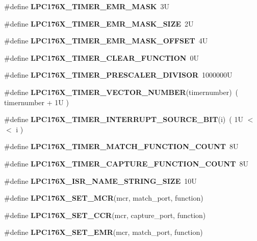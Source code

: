 \begin{DoxyCompactItemize}
\#define {\bfseries L\+P\+C176\+X\+\_\+\+T\+I\+M\+E\+R\+\_\+\+E\+M\+R\+\_\+\+M\+A\+SK}~3U
\item 
\mbox{\label{timer-defs_8h_a35efb7754f2e0741adc25a5b6b3c92e0}} 
\#define {\bfseries L\+P\+C176\+X\+\_\+\+T\+I\+M\+E\+R\+\_\+\+E\+M\+R\+\_\+\+M\+A\+S\+K\+\_\+\+S\+I\+ZE}~2U
\item 
\mbox{\label{timer-defs_8h_a63cfd2f61d07b307faaa2ee0441d631f}} 
\#define {\bfseries L\+P\+C176\+X\+\_\+\+T\+I\+M\+E\+R\+\_\+\+E\+M\+R\+\_\+\+M\+A\+S\+K\+\_\+\+O\+F\+F\+S\+ET}~4U
\item 
\mbox{\label{timer-defs_8h_ab07c438eb3a226c433f157b55249e7a9}} 
\#define {\bfseries L\+P\+C176\+X\+\_\+\+T\+I\+M\+E\+R\+\_\+\+C\+L\+E\+A\+R\+\_\+\+F\+U\+N\+C\+T\+I\+ON}~0U
\item 
\mbox{\label{timer-defs_8h_af234863ba14b9849a55b05299ec98b6a}} 
\#define {\bfseries L\+P\+C176\+X\+\_\+\+T\+I\+M\+E\+R\+\_\+\+P\+R\+E\+S\+C\+A\+L\+E\+R\+\_\+\+D\+I\+V\+I\+S\+OR}~1000000U
\item 
\mbox{\label{timer-defs_8h_a47eab34b594f9d0eacde7f03534b395e}} 
\#define {\bfseries L\+P\+C176\+X\+\_\+\+T\+I\+M\+E\+R\+\_\+\+V\+E\+C\+T\+O\+R\+\_\+\+N\+U\+M\+B\+ER}(timernumber)~( timernumber + 1\+U )
\item 
\mbox{\label{timer-defs_8h_af740ecbe4b3298186cb2282565da9324}} 
\#define {\bfseries L\+P\+C176\+X\+\_\+\+T\+I\+M\+E\+R\+\_\+\+I\+N\+T\+E\+R\+R\+U\+P\+T\+\_\+\+S\+O\+U\+R\+C\+E\+\_\+\+B\+IT}(i)~( 1\+U $<$$<$ i )
\item 
\mbox{\label{timer-defs_8h_a87a7f9118cfd4c1c4b6055786f64d4c3}} 
\#define {\bfseries L\+P\+C176\+X\+\_\+\+T\+I\+M\+E\+R\+\_\+\+M\+A\+T\+C\+H\+\_\+\+F\+U\+N\+C\+T\+I\+O\+N\+\_\+\+C\+O\+U\+NT}~8U
\item 
\mbox{\label{timer-defs_8h_a5354ed74a2b7134279745c37002a6cf4}} 
\#define {\bfseries L\+P\+C176\+X\+\_\+\+T\+I\+M\+E\+R\+\_\+\+C\+A\+P\+T\+U\+R\+E\+\_\+\+F\+U\+N\+C\+T\+I\+O\+N\+\_\+\+C\+O\+U\+NT}~8U
\item 
\mbox{\label{timer-defs_8h_a25831ae8a5ec755f72e0cd7a6895e0f7}} 
\#define {\bfseries L\+P\+C176\+X\+\_\+\+I\+S\+R\+\_\+\+N\+A\+M\+E\+\_\+\+S\+T\+R\+I\+N\+G\+\_\+\+S\+I\+ZE}~10U
\item 
\#define {\bfseries L\+P\+C176\+X\+\_\+\+S\+E\+T\+\_\+\+M\+CR}(mcr,  match\+\_\+port,  function)
\item 
\#define {\bfseries L\+P\+C176\+X\+\_\+\+S\+E\+T\+\_\+\+C\+CR}(mcr,  capture\+\_\+port,  function)
\item 
\#define {\bfseries L\+P\+C176\+X\+\_\+\+S\+E\+T\+\_\+\+E\+MR}(mcr,  match\+\_\+port,  function)
\end{DoxyCompactItemize}
